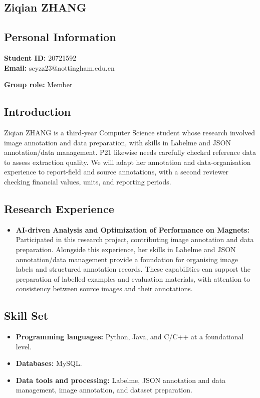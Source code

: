 \documentclass[a4paper,12pt]{article}
\newcommand{\PersonalInformation}[2]{%
  \subsection*{Personal Information}
  \if\relax\detokenize{#1}\relax\else
  \noindent\textbf{Student ID:} #1\\
  \fi
  \textbf{Email:} #2\par
}
\begin{document}
\subsection{Ziqian ZHANG}
\PersonalInformation{20721592}{scyzz23@nottingham.edu.cn}
\noindent\textbf{Group role:} Member\par

\subsection*{Introduction}
Ziqian ZHANG is a third-year Computer Science student whose research involved image annotation and data preparation, with skills in Labelme and JSON annotation/data management. P21 likewise needs carefully checked reference data to assess extraction quality. We will adapt her annotation and data-organisation experience to report-field and source annotations, with a second reviewer checking financial values, units, and reporting periods.

\subsection*{Research Experience}
\begin{itemize}
  \item \textbf{AI-driven Analysis and Optimization of Performance on Magnets:} Participated in this research project, contributing image annotation and data preparation. Alongside this experience, her skills in Labelme and JSON annotation/data management provide a foundation for organising image labels and structured annotation records. These capabilities can support the preparation of labelled examples and evaluation materials, with attention to consistency between source images and their annotations.
\end{itemize}

\subsection*{Skill Set}
\begin{itemize}
  \item \textbf{Programming languages:} Python, Java, and C/C++ at a foundational level.
  \item \textbf{Databases:} MySQL.
  \item \textbf{Data tools and processing:} Labelme, JSON annotation and data management, image annotation, and dataset preparation.
\end{itemize}
\end{document}
